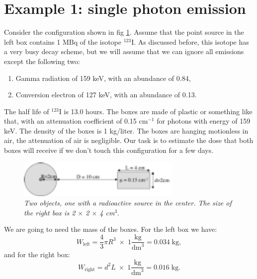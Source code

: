 \documentclass[11pt,oneside]{book}
\begin{document}
\section{Example 1: single photon emission}
Consider the configuration shown in fig \ref{fig:biol-singlephoton}.
Assume that the point source in the left box contains 1 MBq of the
isotope $^{123}$I. As discussed before, this isotope has a very
busy decay scheme, but we will assume that we can ignore all emissions
except the following two:
\begin{enumerate}
  \item Gamma radiation of 159 keV, with an abundance of 0.84,
  \item Conversion electron of 127 keV, with an abundance of 0.13.
\end{enumerate}
The half life of $^{123}$I is 13.0 hours.
The boxes are made of plastic or something like that, with an
attenuation coefficient of 0.15 cm$^{-1}$ for photons with energy
of 159 keV. The density of the boxes is 1 kg/liter.
The boxes are hanging motionless in air, the attenuation
of air is negligible. Our task is to estimate the dose that both boxes
will receive if we don't touch this configuration for a few days.
%
%
\begin{figure}[tb]
\centering
\includegraphics[width=0.7\textwidth]{figs/fig_biol_singlephoton.pdf}
\caption{\label{fig:biol-singlephoton} \emph{Two objects, one with a
radioactive source in the center. The size of the right box is
2 $\times$ 2 $\times$ 4 cm$^3$}.}
\end{figure}

We are going to need the mass of the boxes. For the left box we
have:
\begin{equation}
  W_{\mbox{left}} = \frac{4}{3} \pi R^3 \; \times \; 1 \frac{\mbox{kg}}{\mbox{dm}^3}
      = 0.034 \;\mbox{kg},
\end{equation}
and for the right box:
\begin{equation}
  W_{\mbox{right}} = d^2 L\; \times \; 1 \frac{\mbox{kg}}{\mbox{dm}^3}
      = 0.016 \;\mbox{kg}.
\end{equation}
\end{document}
